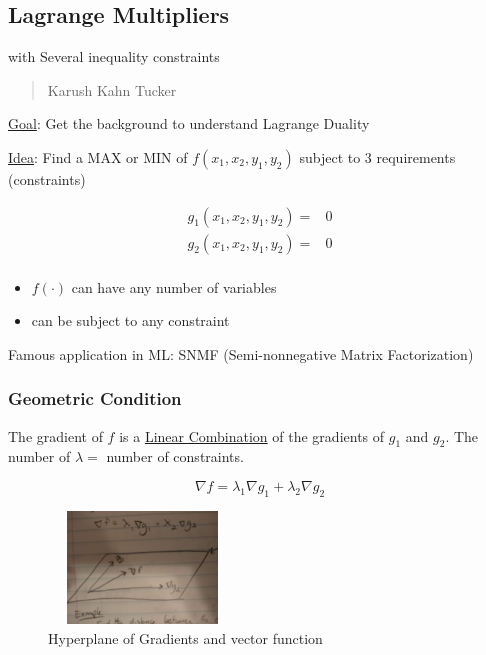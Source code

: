 \documentclass[11pt]{article}
\begin{document}
\subsection{Lagrange Multipliers}
\label{sec:orgbe92aeb}
with Several inequality constraints

\begin{quote}
Karush Kahn Tucker
\end{quote}

\uline{Goal}: Get the background to understand Lagrange Duality

\uline{Idea}: Find a MAX or MIN of \(f(x_1, x_2, y_1, y_2)\) subject to 3 requirements
(constraints)

\begin{equation}
\begin{split}
g_1(x_1, x_2, y_1, y_2) = & 0\\
g_2(x_1, x_2, y_1, y_2) = & 0\\
\end{split}
\end{equation}



\begin{itemize}
\item \(f (\cdot)\) can have any number of variables
\item can be subject to any constraint
\end{itemize}

Famous application in ML: SNMF (Semi-nonnegative Matrix Factorization)

\subsubsection{Geometric Condition}
\label{sec:org5e44f86}

The gradient of \(f\) is a \uline{Linear Combination} of the gradients of \(g_1\) and
\(g_2\). The number of \(\lambda =\) number of constraints.

$$
\nabla f = \lambda_1 \nabla g_1 + \lambda_2 \nabla g_2
$$

\begin{figure}[htbp]
\centering
\includegraphics[width=5cm,height=3cm]{./resources/lagrangian_planes.jpg}
\caption{\label{fig:orgf5c6cea}Hyperplane of Gradients and vector function}
\end{figure}
\end{document}
